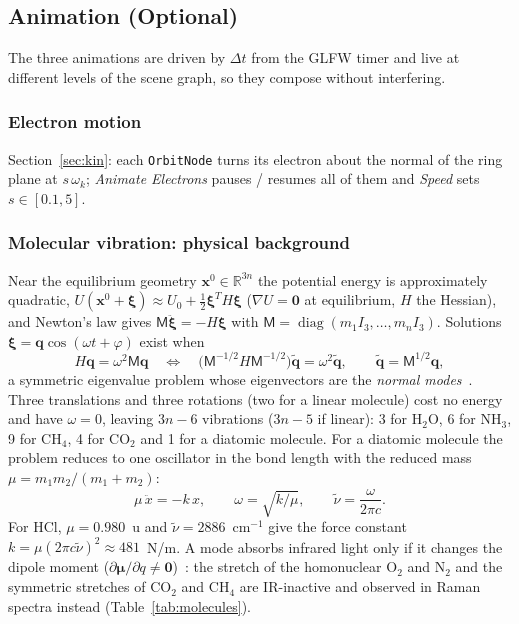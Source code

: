 \documentclass[a4paper, 11pt]{article}
\newcommand{\code}[1]{\texttt{#1}}
\begin{document}
\subsection{Animation (Optional)}\label{sec:anim2}

The three animations are driven by $\Delta t$ from the GLFW timer and live at different levels of the scene graph, so they compose without
interfering.

\subsubsection{Electron motion}
Section~\ref{sec:kin}: each \code{OrbitNode} turns its electron about the normal of the ring plane at $s\,\omega_k$; \emph{Animate Electrons}
pauses / resumes all of them and \emph{Speed} sets $s\in[0.1,5]$.

\subsubsection{Molecular vibration: physical background}

Near the equilibrium geometry $\mathbf x^0\in\mathbb R^{3n}$ the potential energy is approximately quadratic,
$U(\mathbf x^0+\boldsymbol\xi)\approx U_0+\tfrac12\boldsymbol\xi^{T}H\boldsymbol\xi$ ($\nabla U=\mathbf 0$ at equilibrium, $H$ the Hessian),
and Newton's law gives $\mathsf M\ddot{\boldsymbol\xi}=-H\boldsymbol\xi$ with $\mathsf M=\operatorname{diag}(m_1I_3,\dots,m_nI_3)$. Solutions
$\boldsymbol\xi=\mathbf q\cos(\omega t+\varphi)$ exist when
\[
  H\mathbf q=\omega^2\mathsf M\mathbf q
  \quad\Longleftrightarrow\quad
  \bigl(\mathsf M^{-1/2}H\mathsf M^{-1/2}\bigr)\tilde{\mathbf q}=\omega^2\tilde{\mathbf q},\qquad \tilde{\mathbf q}=\mathsf M^{1/2}\mathbf q,
\]
a symmetric eigenvalue problem whose eigenvectors are the \emph{normal modes}~\cite{wilson,molvib}. Three translations and three rotations (two for a
linear molecule) cost no energy and have $\omega=0$, leaving $3n-6$ vibrations ($3n-5$ if linear): 3 for H$_2$O, 6 for NH$_3$, 9 for CH$_4$, 4 for CO$_2$
and 1 for a diatomic molecule. For a diatomic molecule the problem reduces to one oscillator in the bond length with the reduced mass
$\mu=m_1m_2/(m_1+m_2)$:
\[
  \mu\,\ddot x=-k\,x,\qquad \omega=\sqrt{k/\mu},\qquad \tilde\nu=\frac{\omega}{2\pi c}.
\]
For HCl, $\mu=0.980$~u and $\tilde\nu=2886$~cm$^{-1}$ give the force constant $k=\mu(2\pi c\tilde\nu)^2\approx481$~N/m. A mode absorbs infrared light
only if it changes the dipole moment ($\partial\boldsymbol\mu/\partial q\ne\mathbf 0$)~\cite{ir}: the stretch of the homonuclear O$_2$ and N$_2$ and the
symmetric stretches of CO$_2$ and CH$_4$ are IR-inactive and observed in Raman spectra instead (Table~\ref{tab:molecules}).
\end{document}
